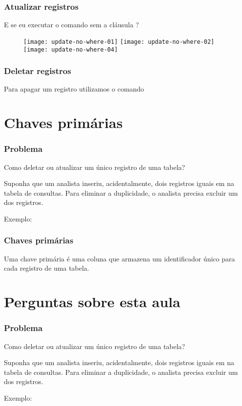 \documentclass[t, 10pt, aspectratio=169, table, x11names]{beamer}
\begin{document}
	\begin{frame}
		\frametitle{Atualizar registros}
		\vspace{-3mm}
			\small
			E se eu executar o comando  sem a cláusula ?
		\reasonboxend
		\begin{figure}
			\centering
			\texttt{[image: update-no-where-01]}
			\hspace{5mm}
			\texttt{[image: update-no-where-02]}
			\hspace{5mm}
			\texttt{[image: update-no-where-04]}
		\end{figure}
	\end{frame}
	
	\begin{frame}
		\frametitle{Deletar registros}
		Para apagar um registro utilizamos o comando \bluehighlight{DELETE}
		
	\end{frame}
	
	\section{Chaves primárias}

	\begin{frame}[t]
		\frametitle{Problema}
		Como deletar ou atualizar um único registro de uma tabela?

		Suponha que um analista inseriu, acidentalmente, dois registros iguais em na tabela de consultas. Para eliminar a duplicidade, o analista precisa excluir um dos registros.

		Exemplo:
	\end{frame}

	\begin{frame}[t]
		\frametitle{Chaves primárias}
		Uma chave primária é uma coluna que armazena um identificador único para cada registro de uma tabela.
	\end{frame}

	\section{Perguntas sobre esta aula}

	\begin{frame}[t]
		\frametitle{Problema}
		Como deletar ou atualizar um único registro de uma tabela?

		Suponha que um analista inseriu, acidentalmente, dois registros iguais em na tabela de consultas. Para eliminar a duplicidade, o analista precisa excluir um dos registros.

		Exemplo:


	\end{frame}
\end{document}
